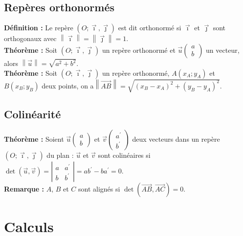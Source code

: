 \documentclass[a4paper,titlepage]{article}
\let\oldsection\section
\renewcommand\section{\clearpage\oldsection}
\begin{document}
    \subsection{Repères orthonormés}
        \textbf{Définition :} Le repère $\left(O;\vec{\imath},\vec{\jmath}\right)$ est dit orthonormé si $\vec{\imath}$ et $\vec{\jmath}$ sont orthogonaux avec $\left\|\vec{\imath}\right\|=\left\|\vec{\jmath}\right\|=1$.
        \\
        \textbf{Théorème :} Soit $\left(O;\vec{\imath},\vec{\jmath}\right)$ un repère orthonormé et $\vec{u}\left(\begin{smallmatrix}a\\b\end{smallmatrix}\right)$ un vecteur, alors $\left\|\vec{u}\right\|=\sqrt{a^{2}+b^{2}}$.
        \\
        \textbf{Théorème :} Soit $\left(O;\vec{\imath},\vec{\jmath}\right)$ un repère orthonormé, $A\left(x_{A};y_{A}\right)$ et $B\left(x_{B};y_{B}\right)$ deux points, on a\linebreak$\left\|\overrightarrow{AB}\right\|=\sqrt{(x_{B}-x_{A})^{2}+(y_{B}-y_{A})^{2}}$.
    \subsection{Colinéarité}
        \textbf{Théorème :} Soient $\vec{u}\left(\begin{smallmatrix}a\\b\end{smallmatrix}\right)$ et $\vec{v}\left(\begin{smallmatrix}a^{\prime}\\b^{\prime}\end{smallmatrix}\right)$ deux vecteurs dans un repère $\left(O;\vec{\imath},\vec{\jmath}\right)$ du plan : $\vec{u}$ et $\vec{v}$ sont colinéaires si $\det\left(\vec{u},\vec{v}\right)=\left|\begin{smallmatrix}a&a^{\prime}\\b&b^{\prime}\end{smallmatrix}\right|=ab^{\prime}-ba^{\prime}=0$.
        \\
        \textbf{Remarque :} $A$, $B$ et $C$ sont alignés si $\det\left(\overrightarrow{AB},\overrightarrow{AC}\right)=0$.
\section{Calculs}
\end{document}
